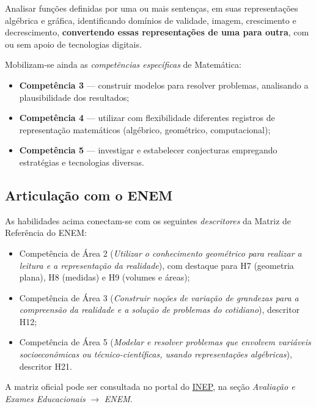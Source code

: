 \documentclass[12pt,a4paper]{scrartcl}
\newcommand{\acc}[1]{\textcolor{accent}{\textbf{#1}}}
\begin{document}
\begin{habilidade}[EM13MAT404]
Analisar funções definidas por uma ou mais sentenças, em suas representações algébrica e gráfica, identificando domínios de validade, imagem, crescimento e decrescimento, \acc{convertendo essas representações de uma para outra}, com ou sem apoio de tecnologias digitais.
\end{habilidade}

\medskip
Mobilizam-se ainda as \emph{competências específicas} de Matemática:

\begin{itemize}[leftmargin=1.3em,itemsep=0.15em,topsep=0.3em]
  \item \acc{Competência 3} --- construir modelos para resolver problemas, analisando a plausibilidade dos resultados;
  \item \acc{Competência 4} --- utilizar com flexibilidade diferentes registros de representação matemáticos (algébrico, geométrico, computacional);
  \item \acc{Competência 5} --- investigar e estabelecer conjecturas empregando estratégias e tecnologias diversas.
\end{itemize}

\subsection{Articulação com o ENEM}\label{sec:enem}

As habilidades acima conectam-se com os seguintes \emph{descritores} da Matriz de Referência do ENEM:

\begin{itemize}[leftmargin=1.3em,itemsep=0.15em,topsep=0.3em]
  \item Competência de Área 2 (\emph{Utilizar o conhecimento geométrico para realizar a leitura e a representação da realidade}), com destaque para H7 (geometria plana), H8 (medidas) e H9 (volumes e áreas);
  \item Competência de Área 3 (\emph{Construir noções de variação de grandezas para a compreensão da realidade e a solução de problemas do cotidiano}), descritor H12;
  \item Competência de Área 5 (\emph{Modelar e resolver problemas que envolvem variáveis socioeconômicas ou técnico-científicas, usando representações algébricas}), descritor H21.
\end{itemize}

A matriz oficial pode ser consultada no portal do \href{https://www.gov.br/inep/}{INEP}, na seção \emph{Avaliação e Exames Educacionais} $\rightarrow$ \emph{ENEM}.
\end{document}
